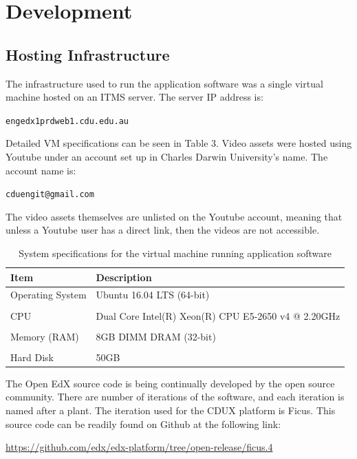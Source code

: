 \documentclass[a4paper]{article}
\begin{document}
\newpage

\section{Development}
\subsection{Hosting Infrastructure}
The infrastructure used to run the application software was a single virtual machine hosted on an ITMS server. The server IP address is:
\begin{center}
\verb|engedx1prdweb1.cdu.edu.au|
\end{center}
Detailed VM specifications can be seen in Table 3. Video assets were hosted using Youtube under an account set up in Charles Darwin University's name. The account name is:
\begin{center}
\verb|cduengit@gmail.com|
\end{center}

The video assets themselves are unlisted on the Youtube account, meaning that unless a Youtube user has a direct link, then the videos are not accessible.

\begin{table}[h]
\centering
\caption{System specifications for the virtual machine running application software}
\begin{tabular}{ll}
\toprule
\textbf{Item} & \textbf{Description}\\
\midrule
Operating System & Ubuntu 16.04 LTS (64-bit)\\
 & \\
CPU & Dual Core Intel(R) Xeon(R) CPU E5-2650 v4 @ 2.20GHz\\
 & \\
Memory (RAM) & 8GB DIMM DRAM (32-bit)\\
 & \\
Hard Disk & 50GB\\
\bottomrule
\end{tabular}
\end{table}

The Open EdX source code is being continually developed by the open source community. There are number of iterations of the software, and each iteration is named after a plant. The iteration used for the CDUX platform is Ficus. This source code can be readily found on Github at the following link:
\begin{center}
\url{https://github.com/edx/edx-platform/tree/open-release/ficus.4}
\end{center}
\end{document}

